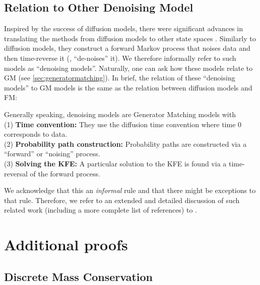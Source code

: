\documentclass{fairmeta}
\newcommand{\highlight}[1]{{\color{metablue} \textbf{#1}}}
\numberwithin{equation}{section}
\begin{document}
\subsection{Relation to Other Denoising Model}
Inspired by the success of diffusion models, there were significant advances in translating the methods from diffusion models to other state spaces \citep{campbell2022continuous,campbell2024generative,de2022riemannian, huang2022riemannian, benton2022denoising}. Similarly to diffusion models, they construct a forward Markov process that noises data and then time-reverse it (\ie, ``de-noises'' it). We therefore informally refer to such models as ``denoising models''. Naturally, one can ask how these models relate to GM (see \cref{sec:generatormatching}). In brief, the relation of these ``denoising models'' to GM models is the same as the relation between diffusion models and FM: 
\begin{myframe}
Generally speaking, denoising models are Generator Matching models with\\
(1) \highlight{Time convention: }They use the diffusion time convention where time $0$ corresponds to data.\\
(2) \highlight{Probability path construction: }Probability paths are constructed via a ``forward'' or ``noising'' process.\\
(3) \highlight{Solving the KFE: }A particular solution to the KFE is found via a time-reversal of the forward process.
\end{myframe}
We acknowledge that this an \emph{informal} rule and that there might be exceptions to that rule. Therefore, we refer to an extended and detailed discussion of such related work (including a more complete list of references) to \citep{holderrieth2024gm}.



\clearpage
\newpage



\clearpage
\newpage
\beginappendix

\section{Additional proofs}
\label{a:proofs}


\subsection{Discrete Mass Conservation}
\label{a:discrete_mass_conservation}
\end{document}
